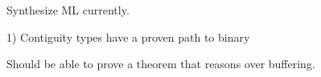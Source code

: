 Synthesize ML currently. 

1) Contiguity types have a proven path to binary

Should be able to prove a theorem that reasons over buffering.